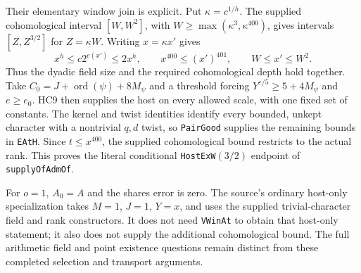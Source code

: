 Their elementary window join is explicit. Put $\kappa=c^{1/h}$.
The supplied cohomological interval $[W,W^2]$, with
$W\ge\max(\kappa^3,\kappa^{400})$, gives intervals
$[Z,Z^{3/2}]$ for $Z=\kappa W$. Writing $x=\kappa x'$ gives
\[
 x^h\le c2^{e(x')}\le2x^h,\qquad
 x^{400}\le(x')^{401},\qquad W\le x'\le W^2.        \tag{HC.16}
\]
Thus the dyadic field size and the required cohomological depth
hold together. Take $C_0=J+\operatorname{ord}(\psi)+8M_\psi$ and
a threshold forcing $Y^{\varepsilon/5}\ge5+4M_\psi$ and $e\ge e_0$.
HC9 then supplies the host on every allowed scale, with one fixed
set of constants. The kernel and twist identities identify every
bounded, unkept character with a nontrivial $q,d$ twist, so
\texttt{PairGood} supplies the remaining bounds in \texttt{EAtH}.
Since $t\le x^{400}$, the supplied cohomological bound restricts
to the actual rank. This proves the literal conditional
\texttt{HostExW}$(3/2)$ endpoint of \texttt{supplyOfAdmOf}.

For $o=1$, $A_0=A$ and the shares error is zero. The source's
ordinary host-only specialization takes $M=1$, $J=1$, $Y=x$,
and uses the supplied trivial-character field and rank constructors.
It does not need \texttt{VWinAt} to obtain that host-only statement;
it also does not supply the additional cohomological bound.
The full arithmetic field and point existence questions remain
distinct from these completed selection and transport arguments.
